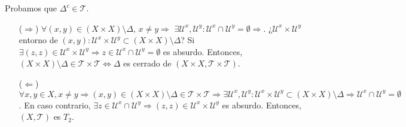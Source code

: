 \begin{dem}
  Probamos que $\Delta^c \in \mathcal{T}$.
  \begin{enumerate}[label=(\roman*)]
    \item [($\Rightarrow$)] $\forall (x,y) \in (X \times X) \setminus \Delta$, $x \neq y \Rightarrow$ $\exists \mathcal{U}^{x}, \mathcal{U}^{y}: \mathcal{U}^{x} \cap \mathcal{U}^{y} = \emptyset \Rightarrow$. ¿$\mathcal{U}^{x} \times \mathcal{U}^{y}$ entorno de $(x,y): \mathcal{U}^{x} \times \mathcal{U}^{y} \subset (X \times X) \setminus \Delta$? Si $\exists (z,z) \in \mathcal{U}^{x} \times \mathcal{U}^{y} \Rightarrow z \in \mathcal{U}^{x} \cap \mathcal{U}^{y} = \emptyset$ es absurdo. Entonces, $(X \times X) \setminus \Delta \in \mathcal{T} \times \mathcal{T} \Leftrightarrow \Delta$ es cerrado de $(X \times X, \mathcal{T} \times \mathcal{T})$.
    \item [($\Leftarrow$)] $\forall x,y \in X, x \neq y \Rightarrow (x, y) \in (X \times X) \setminus \Delta \in \mathcal{T} \times \mathcal{T} \Rightarrow \exists \mathcal{U}^{x}, \mathcal{U}^{y} : \mathcal{U}^{x} \times \mathcal{U}^{y} \subset (X \times X) \setminus \Delta \Rightarrow \mathcal{U}^{x} \cap \mathcal{U}^{y} = \emptyset$. En caso contrario, $\exists z \in \mathcal{U}^{x} \cap \mathcal{U}^{y} \Rightarrow (z, z) \in \mathcal{U}^{x} \times \mathcal{U}^{y}$ es absurdo. Entonces, $( X, \mathcal{T} )$ es $T_{2}$.
  \end{enumerate}
\end{dem}
